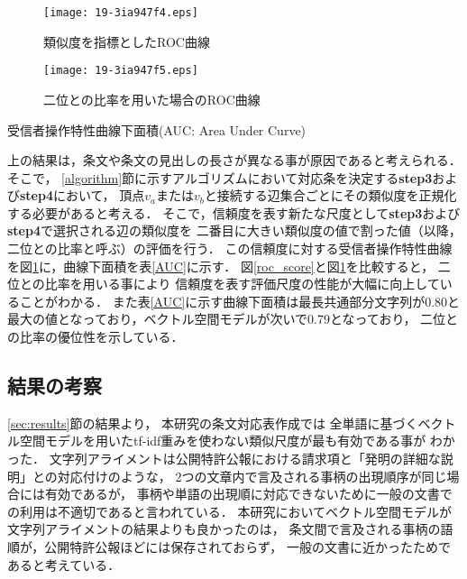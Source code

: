 \documentclass[japanese]{jnlp_1.4}
\begin{document}
\begin{figure}[t]
\begin{minipage}[b]{.5\textwidth}
\begin{center}
\texttt{[image: 19-3ia947f4.eps]}
\end{center}
\caption{類似度を指標としたROC曲線}\label{roc_score}
\end{minipage}
\begin{minipage}[b]{.5\textwidth}
\begin{center}
\texttt{[image: 19-3ia947f5.eps]}
\end{center}
\caption{二位との比率を用いた場合のROC曲線}\label{roc_ratio}
\end{minipage}
\end{figure}

\begin{table}[t]
\caption{受信者操作特性曲線下面積(AUC: Area Under Curve)}
\label{AUC}

\end{table}

上の結果は，条文や条文の見出しの長さが異なる事が原因であると考えられる．
そこで，
\ref{algorithm}節に示すアルゴリズムにおいて対応条を決定する{\bf step3}および{\bf step4}において，
頂点$v_a$または$v_b$と接続する辺集合ごとにその類似度を正規化する必要があると考える．
そこで，信頼度を表す新たな尺度として{\bf step3}および{\bf step4}で選択される辺の類似度を
二番目に大きい類似度の値で割った値（以降，二位との比率と呼ぶ）の評価を行う．
この信頼度に対する受信者操作特性曲線を図\ref{roc_ratio}に，曲線下面積を表\ref{AUC}に示す．
図\ref{roc_score}と図\ref{roc_ratio}を比較すると，
二位との比率を用いる事により
信頼度を表す評価尺度の性能が大幅に向上していることがわかる．
また表\ref{AUC}に示す曲線下面積は最長共通部分文字列が0.80と
最大の値となっており，ベクトル空間モデルが次いで0.79となっており，
二位との比率の優位性を示している．



\subsection{結果の考察}

\ref{sec:results}節の結果より，
本研究の条文対応表作成では
全単語に基づくベクトル空間モデルを用いたtf-idf重みを使わない類似尺度が最も有効である事が
わかった．
文字列アライメントは公開特許公報における請求項と「発明の詳細な説明」との対応付けのような，
2つの文章内で言及される事柄の出現順序が同じ場合には有効であるが\cite{ronbun2-4}，
事柄や単語の出現順に対応できないために一般の文書での利用は不適切であると言われている\cite{ronbun1-1}．
本研究においてベクトル空間モデルが文字列アライメントの結果よりも良かったのは，
条文間で言及される事柄の語順が，公開特許公報ほどには保存されておらず，
一般の文書に近かったためであると考えている．
\end{document}
